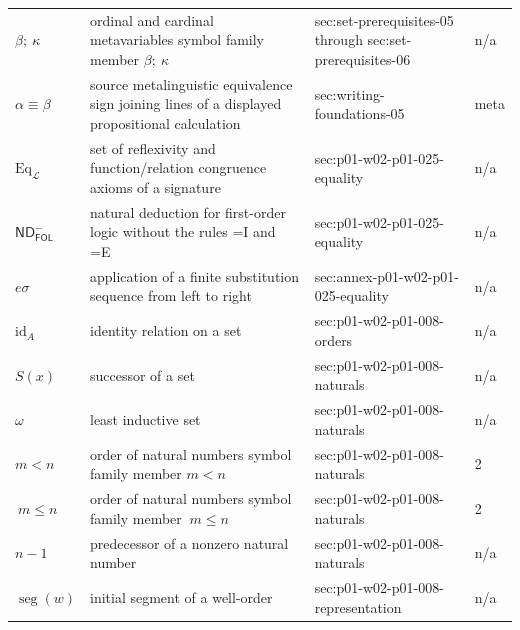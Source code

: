 \begin{longtable}{@{}p{}p{}p{}p{}@{}}
\(\beta;\allowbreak \ \kappa\) & ordinal and cardinal metavariables symbol family member \(\beta;\ \kappa\) & sec:\allowbreak{}set-\allowbreak{}prerequisites-\allowbreak{}05 through sec:\allowbreak{}set-\allowbreak{}prerequisites-\allowbreak{}06 & n/a \\
\(\alpha\equiv\beta\) & source metalinguistic equivalence sign joining lines of a displayed propositional calculation & sec:\allowbreak{}writing-\allowbreak{}foundations-\allowbreak{}05 & meta \\
\(\mathrm{Eq}_{\mathcal L}\) & set of reflexivity and function/relation congruence axioms of a signature & sec:\allowbreak{}p01-\allowbreak{}w02-\allowbreak{}p01-\allowbreak{}025-\allowbreak{}equality & n/a \\
\(\mathsf{ND}^{-}_{\mathsf{FOL}}\) & natural deduction for first-order logic without the rules =I and =E & sec:\allowbreak{}p01-\allowbreak{}w02-\allowbreak{}p01-\allowbreak{}025-\allowbreak{}equality & n/a \\
\(e\sigma\) & application of a finite substitution sequence from left to right & sec:\allowbreak{}annex-\allowbreak{}p01-\allowbreak{}w02-\allowbreak{}p01-\allowbreak{}025-\allowbreak{}equality & n/a \\
\(\mathrm{id}_A\) & identity relation on a set & sec:\allowbreak{}p01-\allowbreak{}w02-\allowbreak{}p01-\allowbreak{}008-\allowbreak{}orders & n/a \\
\(S(x)\) & successor of a set & sec:\allowbreak{}p01-\allowbreak{}w02-\allowbreak{}p01-\allowbreak{}008-\allowbreak{}naturals & n/a \\
\(\omega\) & least inductive set & sec:\allowbreak{}p01-\allowbreak{}w02-\allowbreak{}p01-\allowbreak{}008-\allowbreak{}naturals & n/a \\
\(m<n\) & order of natural numbers symbol family member \(m<n\) & sec:\allowbreak{}p01-\allowbreak{}w02-\allowbreak{}p01-\allowbreak{}008-\allowbreak{}naturals & 2 \\
\(\ m\leq n\) & order of natural numbers symbol family member \(\ m\leq n\) & sec:\allowbreak{}p01-\allowbreak{}w02-\allowbreak{}p01-\allowbreak{}008-\allowbreak{}naturals & 2 \\
\(n-1\) & predecessor of a nonzero natural number & sec:\allowbreak{}p01-\allowbreak{}w02-\allowbreak{}p01-\allowbreak{}008-\allowbreak{}naturals & n/a \\
\(\operatorname{seg}(w)\) & initial segment of a well-order & sec:\allowbreak{}p01-\allowbreak{}w02-\allowbreak{}p01-\allowbreak{}008-\allowbreak{}representation & n/a \\

\end{longtable}
